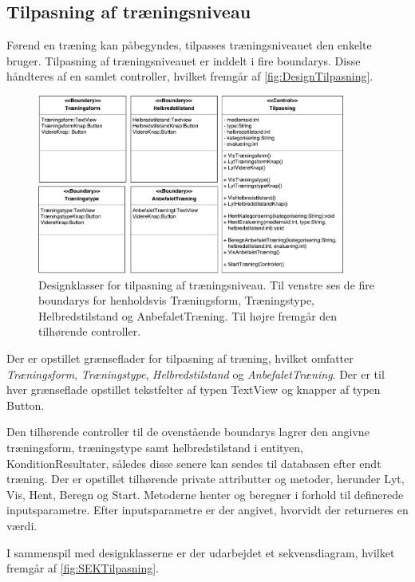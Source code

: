 \subsection*{Tilpasning af træningsniveau}
Førend en træning kan påbegyndes, tilpasses træningsniveauet den enkelte bruger. Tilpasning af træningsniveauet er inddelt i fire boundarys. Disse håndteres af en samlet controller, hvilket fremgår af \autoref{fig:DesignTilpasning}.

\begin{figure} [H]
\centering
\includegraphics[width=0.9\textwidth]{figures/MVC/MVCTilpasning}
\caption{Designklasser for tilpasning af træningsniveau. Til venstre ses de fire boundarys for henholdsvis Træningsform, Træningstype, Helbredstilstand og AnbefaletTræning. Til højre fremgår den tilhørende controller.}
\label{fig:DesignTilpasning}
\end{figure}

\noindent
Der er opstillet grænseflader for tilpasning af træning, hvilket omfatter \textit{Træningsform}, \textit{Træningstype}, \textit{Helbredstilstand} og \textit{AnbefaletTræning}. Der er til hver grænseflade opstillet tekstfelter af typen TextView og knapper af typen Button.   

Den tilhørende controller til de ovenstående boundarys lagrer den angivne træningsform, træningstype samt helbredstilstand  i entityen, KonditionResultater, således disse senere kan sendes til databasen efter endt træning. Der er opstillet tilhørende private attributter og metoder, herunder Lyt, Vis, Hent, Beregn og Start. Metoderne henter og beregner i forhold til definerede inputsparametre. Efter inputsparametre er der angivet, hvorvidt der returneres en værdi.

I sammenspil med designklasserne er der udarbejdet et sekvensdiagram, hvilket fremgår af \autoref{fig:SEKTilpasning}. 

